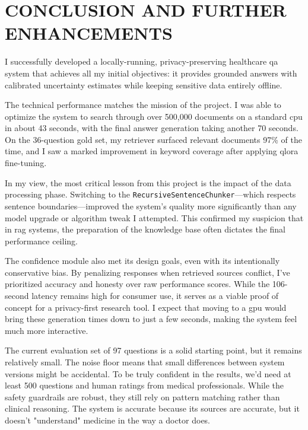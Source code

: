 \chapter{\MakeUppercase{Conclusion and Further Enhancements}}

I successfully developed a locally-running, privacy-preserving healthcare \ac{qa} system that achieves all my initial objectives: it provides grounded answers with calibrated uncertainty estimates while keeping sensitive data entirely offline. 

The technical performance matches the mission of the project. I was able to optimize the system to search through over 500,000 documents on a standard \ac{cpu} in about 43 seconds, with the final answer generation taking another 70 seconds. On the 36-question gold set, my retriever surfaced relevant documents 97\% of the time, and I saw a marked improvement in keyword coverage after applying \ac{qlora} fine-tuning.

In my view, the most critical lesson from this project is the impact of the data processing phase. Switching to the \texttt{RecursiveSentenceChunker}---which respects sentence boundaries---improved the system's quality more significantly than any model upgrade or algorithm tweak I attempted. This confirmed my suspicion that in \ac{rag} systems, the preparation of the knowledge base often dictates the final performance ceiling. 

The confidence module also met its design goals, even with its intentionally conservative bias. By penalizing responses when retrieved sources conflict, I've prioritized accuracy and honesty over raw performance scores. While the 106-second latency remains high for consumer use, it serves as a viable proof of concept for a privacy-first research tool. I expect that moving to a \ac{gpu} would bring these generation times down to just a few seconds, making the system feel much more interactive.

The current evaluation set of 97 questions is a solid starting point, but it remains relatively small. The noise floor means that small differences between system versions might be accidental. To be truly confident in the results, we’d need at least 500 questions and human ratings from medical professionals. While the safety guardrails are robust, they still rely on pattern matching rather than clinical reasoning. The system is accurate because its sources are accurate, but it doesn't "understand" medicine in the way a doctor does. 

